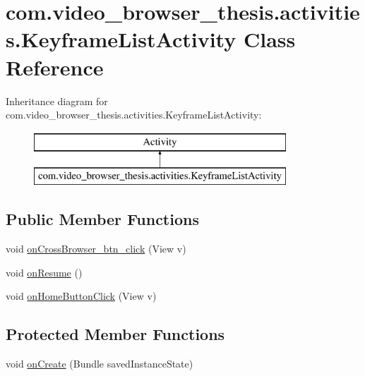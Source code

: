 \hypertarget{classcom_1_1video__browser__thesis_1_1activities_1_1_keyframe_list_activity}{\section{com.\-video\-\_\-browser\-\_\-thesis.\-activities.\-Keyframe\-List\-Activity Class Reference}
\label{classcom_1_1video__browser__thesis_1_1activities_1_1_keyframe_list_activity}
}
Inheritance diagram for com.\-video\-\_\-browser\-\_\-thesis.\-activities.\-Keyframe\-List\-Activity\-:\begin{figure}[H]
\begin{center}
\leavevmode
\includegraphics[height=2.000000cm]{classcom_1_1video__browser__thesis_1_1activities_1_1_keyframe_list_activity}
\end{center}
\end{figure}
\subsection*{Public Member Functions}
\begin{DoxyCompactItemize}
\item 
void \hyperlink{classcom_1_1video__browser__thesis_1_1activities_1_1_keyframe_list_activity_a302e29acaadae66a1faf9a15b50cca3c}{on\-Cross\-Browser\-\_\-btn\-\_\-click} (View v)
\item 
void \hyperlink{classcom_1_1video__browser__thesis_1_1activities_1_1_keyframe_list_activity_a5e7b617dd0cf1e3a2fa4d0e55d91be3d}{on\-Resume} ()
\item 
void \hyperlink{classcom_1_1video__browser__thesis_1_1activities_1_1_keyframe_list_activity_a6527b2a168d6031141a3668fe157ea9d}{on\-Home\-Button\-Click} (View v)
\end{DoxyCompactItemize}
\subsection*{Protected Member Functions}
\begin{DoxyCompactItemize}
\item 
void \hyperlink{classcom_1_1video__browser__thesis_1_1activities_1_1_keyframe_list_activity_a66e62819d88b1e79836dadabab9a6390}{on\-Create} (Bundle saved\-Instance\-State)
\end{DoxyCompactItemize}


